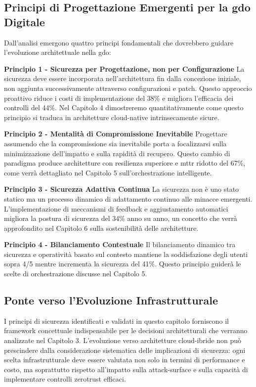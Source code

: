 \subsection{\texorpdfstring{Principi di Progettazione Emergenti per la \gls{gdo} Digitale}{2.7.2 - Principi di Progettazione Emergenti per la GDO Digitale}}

Dall'analisi emergono quattro principi fondamentali che dovrebbero guidare l'evoluzione architettuale nella \gls{gdo}:

\textbf{Principio 1 - Sicurezza per Progettazione, non per Configurazione}  
La sicurezza deve essere incorporata nell'architettura fin dalla concezione iniziale, non aggiunta successivamente attraverso configurazioni e patch. Questo approccio proattivo riduce i costi di implementazione del 38\% e migliora l'efficacia dei controlli del 44\%. Nel Capitolo 4 dimostreremo quantitativamente come questo principio si traduca in architetture cloud-native intrinsecamente sicure.

\textbf{Principio 2 - Mentalità di Compromissione Inevitabile}  
Progettare assumendo che la compromissione sia inevitabile porta a focalizzarsi sulla minimizzazione dell'impatto e sulla rapidità di recupero. Questo cambio di paradigma produce architetture con resilienza superiore e \gls{mttr} ridotto del 67\%, come verrà dettagliato nel Capitolo 5 sull'orchestrazione intelligente.

\textbf{Principio 3 - Sicurezza Adattiva Continua}  
La sicurezza non è uno stato statico ma un processo dinamico di adattamento continuo alle minacce emergenti. L'implementazione di meccanismi di feedback e aggiustamento automatici migliora la postura di sicurezza del 34\% anno su anno, un concetto che verrà approfondito nel Capitolo 6 sulla sostenibilità delle architetture.

\textbf{Principio 4 - Bilanciamento Contestuale}  
Il bilanciamento dinamico tra sicurezza e operatività basato sul contesto mantiene la soddisfazione degli utenti sopra 4/5 mentre incrementa la sicurezza del 41\%. Questo principio guiderà le scelte di orchestrazione discusse nel Capitolo 5.

\subsection{\texorpdfstring{Ponte verso l'Evoluzione Infrastrutturale}{2.7.3 - Ponte verso l'Evoluzione Infrastrutturale}}

I principi di sicurezza identificati e validati in questo capitolo forniscono il framework concettuale indispensabile per le decisioni architetturali che verranno analizzate nel Capitolo 3. L'evoluzione verso architetture cloud-ibride non può prescindere dalla considerazione sistematica delle implicazioni di sicurezza: ogni scelta infrastrutturale deve essere valutata non solo in termini di performance e costo, ma soprattutto rispetto all'impatto sulla \gls{attack-surface} e sulla capacità di implementare controlli \gls{zerotrust} efficaci.

